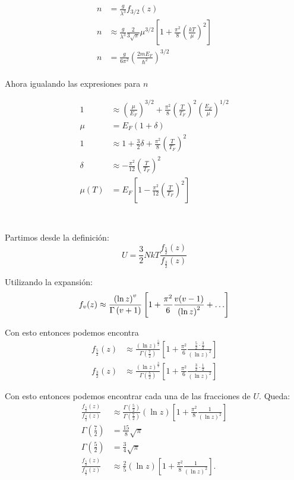 \documentclass{report}
\begin{document}
\begin{align*}
  n &= \frac{g}{\lambda^3} f_{3/2}(z)\\
  n &\approx \frac{g}{\lambda^3} \frac{2}{3\sqrt{\pi}} \mu^{3/2} \left[ 1 + \frac{\pi^2}{8} \left( \frac{kT}{\mu} \right)^2 \right]\\
  n &= \frac{g}{6\pi^2} \left( \frac{2mE_F}{\hbar^2} \right)^{3/2}\\
\end{align*}

Ahora igualando las expresiones para $n$

\begin{align*}
  1 &\approx \left( \frac{\mu}{E_F} \right)^{3/2} + \frac{\pi^2}{8} \left( \frac{T}{T_F} \right)^2 \left( \frac{E_F}{\mu} \right)^{1/2}\\
  \mu &= E_F(1 + \delta)\\
  1 &\approx 1 + \frac{3}{2}\delta + \frac{\pi^2}{8} \left( \frac{T}{T_F} \right)^2\\
  \delta &\approx -\frac{\pi^2}{12} \left( \frac{T}{T_F} \right)^2\\
  \mu(T) &= E_F \left[ 1 - \frac{\pi^2}{12} \left( \frac{T}{T_F} \right)^2 \right]\\
\end{align*}

\section{}

Partimos desde la definición:
\[
  U = \frac{3}{2}NkT\frac{f_{\frac{5}{2}}(z)}{f_{\frac{3}{2}}(z)}
\]

Utilizando la expansión:
\[
  f_v(z) \approx \frac{\left(\ln z\right)^v}{\Gamma\left(v + 1\right)} \left[1 + \frac{\pi^2}{6}\frac{v(v - 1)}{\left(\ln z\right)^2} + \ldots \right]
\]

Con esto entonces podemos encontra
\begin{align*}
f_{\frac{5}{2}}(z) &\approx \frac{(\ln z)^{\frac{5}{2}}}{\Gamma\left(\frac{7}{2}\right)} \left[ 1 + \frac{\pi^2}{6} \frac{\frac{5}{2} \cdot \frac{3}{2}}{(\ln z)^2} \right]\\
f_{\frac{3}{2}}(z) &\approx \frac{(\ln z)^{\frac{3}{2}}}{\Gamma\left(\frac{5}{2}\right)} \left[ 1 + \frac{\pi^2}{6} \frac{\frac{3}{2} \cdot \frac{1}{2}}{(\ln z)^2} \right]
\end{align*}

Con esto entonces podemos encontrar cada una de las fracciones de $U$. Queda:
\begin{align*}
  \frac{f_{\frac{5}{2}}(z)}{f_{\frac{3}{2}}(z)} &\approx \frac{\Gamma\left(\frac{5}{2}\right)}{\Gamma\left(\frac{7}{2}\right)} (\ln z) \left[ 1 + \frac{\pi^2}{8} \frac{1}{(\ln z)^2} \right]\\
  \Gamma\left(\frac{7}{2}\right) &= \frac{15}{8}\sqrt{\pi}\\
  \Gamma\left(\frac{5}{2}\right) &= \frac{3}{4}\sqrt{\pi}\\
  \frac{f_{\frac{5}{2}}(z)}{f_{\frac{3}{2}}(z)} &\approx \frac{2}{5} (\ln z) \left[ 1 + \frac{\pi^2}{8} \frac{1}{(\ln z)^2} \right].
\end{align*}
\end{document}
